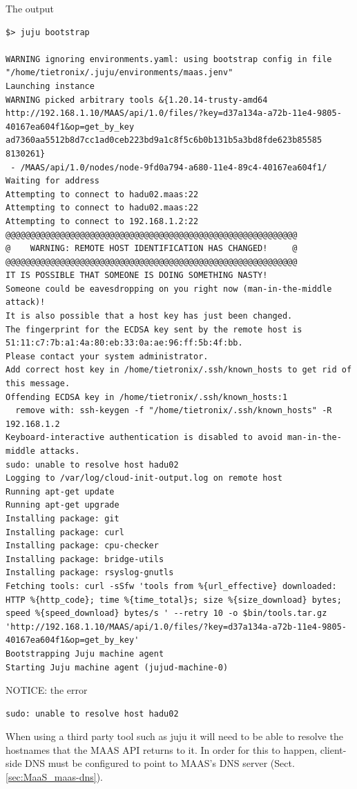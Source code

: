 The output
\begin{verbatim}
$> juju bootstrap

WARNING ignoring environments.yaml: using bootstrap config in file "/home/tietronix/.juju/environments/maas.jenv"
Launching instance
WARNING picked arbitrary tools &{1.20.14-trusty-amd64 http://192.168.1.10/MAAS/api/1.0/files/?key=d37a134a-a72b-11e4-9805-40167ea604f1&op=get_by_key ad7360aa5512b8d7cc1ad0ceb223bd9a1c8f5c6b0b131b5a3bd8fde623b85585 8130261}
 - /MAAS/api/1.0/nodes/node-9fd0a794-a680-11e4-89c4-40167ea604f1/
Waiting for address
Attempting to connect to hadu02.maas:22
Attempting to connect to hadu02.maas:22
Attempting to connect to 192.168.1.2:22
@@@@@@@@@@@@@@@@@@@@@@@@@@@@@@@@@@@@@@@@@@@@@@@@@@@@@@@@@@@
@    WARNING: REMOTE HOST IDENTIFICATION HAS CHANGED!     @
@@@@@@@@@@@@@@@@@@@@@@@@@@@@@@@@@@@@@@@@@@@@@@@@@@@@@@@@@@@
IT IS POSSIBLE THAT SOMEONE IS DOING SOMETHING NASTY!
Someone could be eavesdropping on you right now (man-in-the-middle attack)!
It is also possible that a host key has just been changed.
The fingerprint for the ECDSA key sent by the remote host is
51:11:c7:7b:a1:4a:80:eb:33:0a:ae:96:ff:5b:4f:bb.
Please contact your system administrator.
Add correct host key in /home/tietronix/.ssh/known_hosts to get rid of this message.
Offending ECDSA key in /home/tietronix/.ssh/known_hosts:1
  remove with: ssh-keygen -f "/home/tietronix/.ssh/known_hosts" -R 192.168.1.2
Keyboard-interactive authentication is disabled to avoid man-in-the-middle attacks.
sudo: unable to resolve host hadu02
Logging to /var/log/cloud-init-output.log on remote host
Running apt-get update
Running apt-get upgrade
Installing package: git
Installing package: curl
Installing package: cpu-checker
Installing package: bridge-utils
Installing package: rsyslog-gnutls
Fetching tools: curl -sSfw 'tools from %{url_effective} downloaded: HTTP %{http_code}; time %{time_total}s; size %{size_download} bytes; speed %{speed_download} bytes/s ' --retry 10 -o $bin/tools.tar.gz 'http://192.168.1.10/MAAS/api/1.0/files/?key=d37a134a-a72b-11e4-9805-40167ea604f1&op=get_by_key'
Bootstrapping Juju machine agent
Starting Juju machine agent (jujud-machine-0)
\end{verbatim}

NOTICE: the error
\begin{verbatim}
sudo: unable to resolve host hadu02
\end{verbatim}
When using a third party tool such as juju it will need to be able to resolve
the hostnames that the MAAS API returns to it. In order for this to happen,
client-side DNS must be configured to point to MAAS's DNS server
(Sect.\ref{sec:MaaS_maas-dns}).


